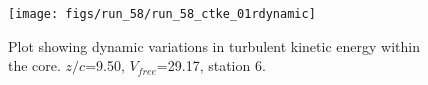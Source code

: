 \begin{figure}[H]
\centering
\texttt{[image: figs/run\_58/run\_58\_ctke\_01rdynamic]}
\caption{Plot showing dynamic variations in turbulent kinetic energy within the core. $z/c$=9.50, $V_{free}$=29.17, station 6.}
\label{fig:run_58_ctke_01rdynamic}
\end{figure}


